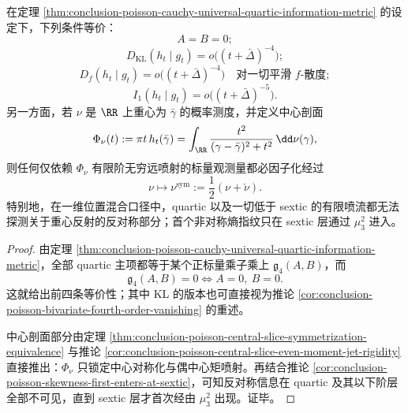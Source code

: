 \begin{corollary}\label{cor:conclusion-poisson-cauchy-quartic-kernel-parity-barrier}
在定理 \ref{thm:conclusion-poisson-cauchy-universal-quartic-information-metric} 的设定下，下列条件等价：
\[
A=B=0;
\]
\[
D_{\mathrm{KL}}(h_t\mid g_t)=o\bigl((t+\bar\Delta)^{-4}\bigr);
\]
\[
D_f(h_t\mid g_t)=o\bigl((t+\bar\Delta)^{-4}\bigr)
\quad\text{对一切平滑 }f\text{-散度};
\]
\[
I_1(h_t\mid g_t)=o\bigl((t+\bar\Delta)^{-5}\bigr).
\]
另一方面，若 \(\nu\) 是 \(\RR\) 上重心为 \(\bar\gamma\) 的概率测度，并定义中心剖面
\[
\Phi_\nu(t):=\pi t\,h_t(\bar\gamma)
=
\int_{\RR}\frac{t^2}{(\gamma-\bar\gamma)^2+t^2}\,\dd\nu(\gamma),
\]
则任何仅依赖 \(\Phi_\nu\) 有限阶无穷远喷射的标量观测量都必因子化经过
\[
\nu\longmapsto \nu^{\mathrm{sym}}:=\frac12(\nu+\check\nu).
\]
特别地，在一维位置混合口径中，quartic 以及一切低于 sextic 的有限喷流都无法探测关于重心反射的反对称部分；首个非对称熵指纹只在 sextic 层通过 \(\mu_3^2\) 进入。
\end{corollary}
\begin{proof}
由定理 \ref{thm:conclusion-poisson-cauchy-universal-quartic-information-metric}，全部 quartic 主项都等于某个正标量乘子乘上 \(\mathfrak g_4(A,B)\)，而
\[
\mathfrak g_4(A,B)=0
\iff
A=0,\ B=0.
\]
这就给出前四条等价性；其中 KL 的版本也可直接视为推论 \ref{cor:conclusion-poisson-bivariate-fourth-order-vanishing} 的重述。

中心剖面部分由定理 \ref{thm:conclusion-poisson-central-slice-symmetrization-equivalence} 与推论 \ref{cor:conclusion-poisson-central-slice-even-moment-jet-rigidity} 直接推出：\(\Phi_\nu\) 只锁定中心对称化与偶中心矩喷射。再结合推论 \ref{cor:conclusion-poisson-skewness-first-enters-at-sextic}，可知反对称信息在 quartic 及其以下阶层全部不可见，直到 sextic 层才首次经由 \(\mu_3^2\) 出现。证毕。
\end{proof}

